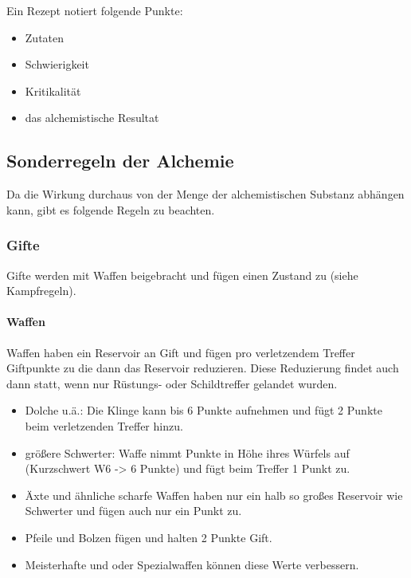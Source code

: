 \documentclass{article}
\begin{document}
Ein Rezept notiert folgende Punkte:

\begin{itemize}
\item Zutaten
\item Schwierigkeit
\item Kritikalität
\item das alchemistische Resultat
\end{itemize}

\begin{center}
\subsection{Sonderregeln der Alchemie}
\end{center}

Da die Wirkung durchaus von der Menge der alchemistischen Substanz abhängen kann, gibt es folgende Regeln zu beachten.

\subsubsection{Gifte}

Gifte werden mit Waffen beigebracht und fügen einen Zustand zu (siehe Kampfregeln).

\paragraph{Waffen}

Waffen haben ein Reservoir an Gift und fügen pro verletzendem Treffer Giftpunkte zu die dann das Reservoir reduzieren.
Diese Reduzierung findet auch dann statt, wenn nur Rüstungs- oder Schildtreffer gelandet wurden.

\begin{itemize}
\item Dolche u.ä.: Die Klinge kann bis 6 Punkte aufnehmen und fügt 2 Punkte beim verletzenden Treffer hinzu.
\item größere Schwerter: Waffe nimmt Punkte in Höhe ihres Würfels auf (Kurzschwert W6 -> 6 Punkte) und fügt beim Treffer 1 Punkt zu.
\item Äxte und ähnliche scharfe Waffen haben nur ein halb so großes Reservoir wie Schwerter und fügen auch nur ein Punkt zu.
\item Pfeile und Bolzen fügen und halten 2 Punkte Gift.
\item Meisterhafte und oder Spezialwaffen können diese Werte verbessern.
\end{itemize}
\end{document}
